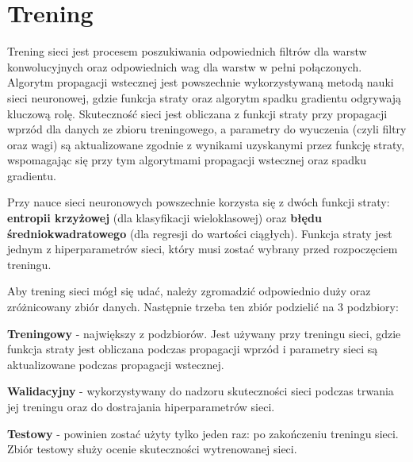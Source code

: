 \section{Trening}
Trening sieci jest procesem poszukiwania odpowiednich filtrów dla warstw konwolucyjnych oraz odpowiednich wag dla warstw w pełni połączonych. Algorytm propagacji wstecznej \cite{kostadinov:backpropagation} jest powszechnie wykorzystywaną metodą nauki sieci neuronowej, gdzie funkcja straty \cite{brownlee:lossFun} oraz algorytm spadku gradientu \cite{kwiatkowski:gradientDescent} odgrywają kluczową rolę. Skuteczność sieci jest obliczana z funkcji straty przy propagacji wprzód dla danych ze zbioru treningowego, a parametry do wyuczenia (czyli filtry oraz wagi) są aktualizowane zgodnie z wynikami uzyskanymi przez funkcję straty, wspomagając się przy tym algorytmami propagacji wstecznej oraz spadku gradientu.

Przy nauce sieci neuronowych powszechnie korzysta się z dwóch funkcji straty: \textbf{entropii krzyżowej} (dla klasyfikacji wieloklasowej) \cite{brownlee:crossEntropy} oraz \textbf{błędu średniokwadratowego} (dla regresji do wartości ciągłych). Funkcja straty jest jednym z hiperparametrów sieci, który musi zostać wybrany przed rozpoczęciem treningu.

Aby trening sieci mógł się udać, należy zgromadzić odpowiednio duży oraz zróżnicowany zbiór danych. Następnie trzeba ten zbiór podzielić na 3 podzbiory:
\begin{enumerate*}
\item \textbf{Treningowy} - największy z podzbiorów. Jest używany przy treningu sieci, gdzie funkcja straty jest obliczana podczas propagacji wprzód i parametry sieci są aktualizowane podczas propagacji wstecznej.
\item \textbf{Walidacyjny} - wykorzystywany do nadzoru skuteczności sieci podczas trwania jej treningu oraz do dostrajania hiperparametrów sieci.
\item \textbf{Testowy} - powinien zostać użyty tylko jeden raz: po zakończeniu treningu sieci. Zbiór testowy służy ocenie skuteczności wytrenowanej sieci.
\end{enumerate*}


